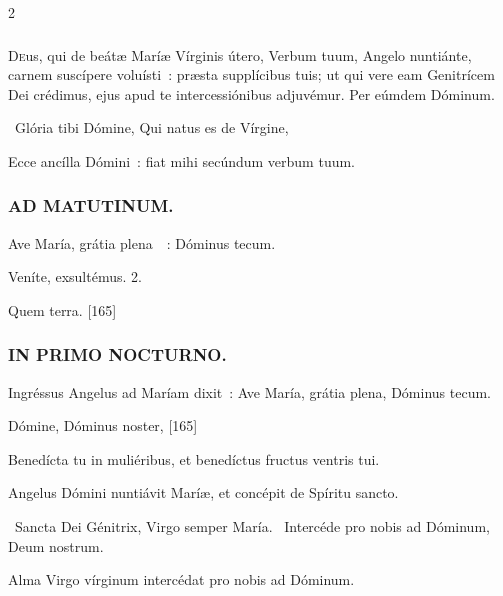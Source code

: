 \documentclass[9pt,twoside]{extarticle}
\begin{document}
\begin{multicols}{2}
{\subsubsection*{\center {}}
\lettrine{D}eus, qui de beátæ Maríæ Vírginis útero, Verbum tuum, Angelo nuntiánte, carnem suscípere voluísti~: præsta supplícibus tuis; ut qui vere eam Genitrícem Dei crédimus, ejus apud te intercessiónibus adjuvémur. Per eúmdem Dóminum.

\begin{tightlist}{}
\item {}~Glória tibi Dómine, Qui natus es de Vírgine, 
\item {} Ecce ancílla Dómini~: fiat mihi secúndum verbum tuum.
\end{tightlist}

\subsubsection*{\center \textsc{AD MATUTINUM.}}
\begin{tightlist}{}
\item {} Ave María, grátia plena~~: \textred{*} Dóminus tecum.
\item {} Veníte, exsultémus. 2.
\item {} Quem terra. [165]
\end{tightlist}

\subsubsection*{\center \textsc{IN PRIMO NOCTURNO.}}
\begin{tightlist}{}
\item {} Ingréssus Angelus ad Maríam dixit~: Ave María, grátia plena, Dóminus tecum.
\item {} Dómine, Dóminus noster,  [165]
\item {} Benedícta tu in muliéribus, et benedíctus fructus ventris tui.
\item {} Angelus Dómini nuntiávit Maríæ, et concépit de Spíritu sancto.
\item {}~Sancta Dei Génitrix, Virgo semper María. ~Intercéde pro nobis ad Dóminum, Deum nostrum.
\item {}
\item {\small {} Alma Virgo vírginum intercédat pro nobis ad Dóminum.}
\end{tightlist}

}
\end{multicols}
\end{document}
